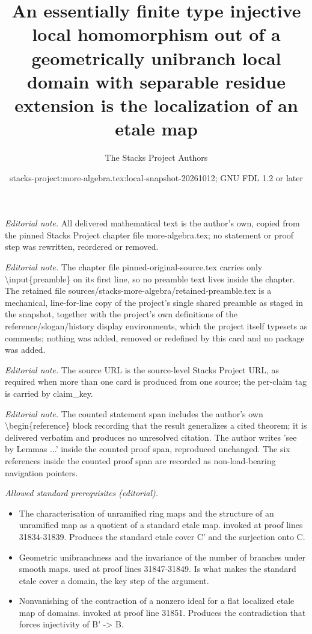 \documentclass[10pt,a4paper]{amsart}
\title{An essentially finite type injective local homomorphism out of a geometrically unibranch local domain with separable residue extension is the localization of an etale map}
\author{The Stacks Project Authors}
\date{stacks-project:more-algebra.tex:local-snapshot-20261012; GNU FDL 1.2 or later}
\theoremstyle{plain}
\theoremstyle{definition}
\theoremstyle{remark}
\numberwithin{equation}{subsection}
\begin{document}
\maketitle
\setcounter{subsection}{1}
\noindent\textit{Editorial note.} All delivered mathematical text is the author's own, copied from the pinned Stacks Project chapter file more-algebra.tex; no statement or proof step was rewritten, reordered or removed.\par\medskip
\noindent\textit{Editorial note.} The chapter file pinned-original-source.tex carries only \textbackslash{}input\{preamble\} on its first line, so no preamble text lives inside the chapter. The retained file sources/stacks-more-algebra/retained-preamble.tex is a mechanical, line-for-line copy of the project's single shared preamble as staged in the snapshot, together with the project's own definitions of the reference/slogan/history display environments, which the project itself typesets as comments; nothing was added, removed or redefined by this card and no package was added.\par\medskip
\noindent\textit{Editorial note.} The source URL is the source-level Stacks Project URL, as required when more than one card is produced from one source; the per-claim tag is carried by claim\_key.\par\medskip
\noindent\textit{Editorial note.} The counted statement span includes the author's own \textbackslash{}begin\{reference\} block recording that the result generalizes a cited theorem; it is delivered verbatim and produces no unresolved citation. The author writes 'see by Lemmas ...' inside the counted proof span, reproduced unchanged. The six references inside the counted proof span are recorded as non-load-bearing navigation pointers.\par\medskip
\noindent\textit{Allowed standard prerequisites (editorial).}\begin{itemize}
\item The characterisation of unramified ring maps and the structure of an unramified map as a quotient of a standard etale map. invoked at proof lines 31834-31839. Produces the standard etale cover C' and the surjection onto C.
\item Geometric unibranchness and the invariance of the number of branches under smooth maps. used at proof lines 31847-31849. Is what makes the standard etale cover a domain, the key step of the argument.
\item Nonvanishing of the contraction of a nonzero ideal for a flat localized etale map of domains. invoked at proof line 31851. Produces the contradiction that forces injectivity of B' -> B.
\end{itemize}\medskip
\end{document}
